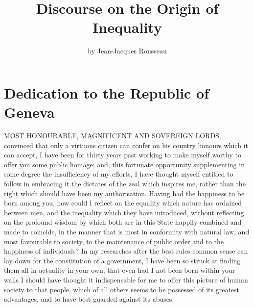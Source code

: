 \documentclass[12pt]{report}
\title{\HUGE\bfseries{Discourse on the Origin of Inequality}}
\author{\Large by Jean-Jacques Rousseau}
\date{\vspace{-4mm}Translated 1923 by G. D. H. Cole
\vfill
\epigraph{\normalsize\itshape We should consider what is natural not in things depraved but in those which are rightly ordered according to nature. }{\large Aristotle,\textit{ Politics}, Bk. I, ch. 5}}
\begin{document}
\begin{titlepage}
    \maketitle
\end{titlepage}

\renewcommand*\contentsname{\vspace{-1cm} Table of Contents}
\tableofcontents

\chapter*{\LARGE Dedication to the Republic of Geneva}
MOST HONOURABLE, MAGNIFICENT AND SOVEREIGN LORDS, convinced that only a virtuous citizen can confer on his country honours which it can accept, I have been for thirty years past working to make myself worthy to offer you some public homage; and, this fortunate opportunity supplementing in some degree the insufficiency of my efforts, I have thought myself entitled to follow in embracing it the dictates of the zeal which inspires me, rather than the right which should have been my authorisation. Having had the happiness to be born among you, how could I reflect on the equality which nature has ordained between men, and the inequality which they have introduced, without reflecting on the profound wisdom by which both are in this State happily combined and made to coincide, in the manner that is most in conformity with natural law, and most favourable to society, to the maintenance of public order and to the happiness of individuals? In my researches after the best rules common sense can lay down for the constitution of a government, I have been so struck at finding them all in actuality in your own, that even had I not been born within your walls I should have thought it indispensable for me to offer this picture of human society to that people, which of all others seems to be possessed of its greatest advantages, and to have best guarded against its abuses.
\end{document}
